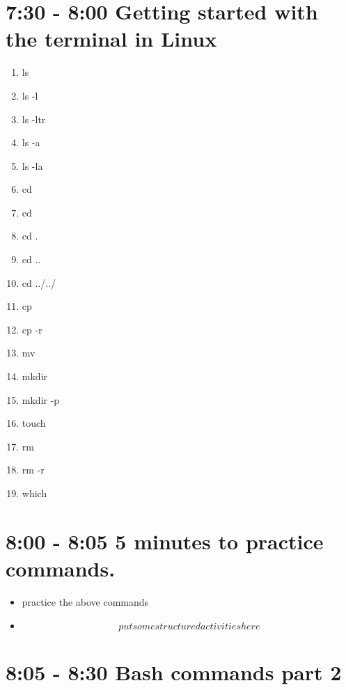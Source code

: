 \documentclass[10pt]{article}
\begin{document}
\section{7:30 - 8:00 Getting started with the terminal in Linux}
\begin{multicols}{4}
\begin{enumerate}
\item ls
\item ls -l
\item ls -ltr
\item ls -a
\item ls -la
\item cd $~$
\item cd
\item cd .
\item cd ..
\item cd ../../
\item cp
\item cp -r
\item mv
\item mkdir
\item mkdir -p
\item touch
\item rm 
\item rm -r
\item which 
\end{enumerate}
\end{multicols}
\section{8:00 - 8:05 5 minutes to practice commands. }

\begin{itemize}
\item practice the above commands
\item \[put some structured activities here \]
\end{itemize}


\section{8:05 - 8:30 Bash commands part 2}
\end{document}
